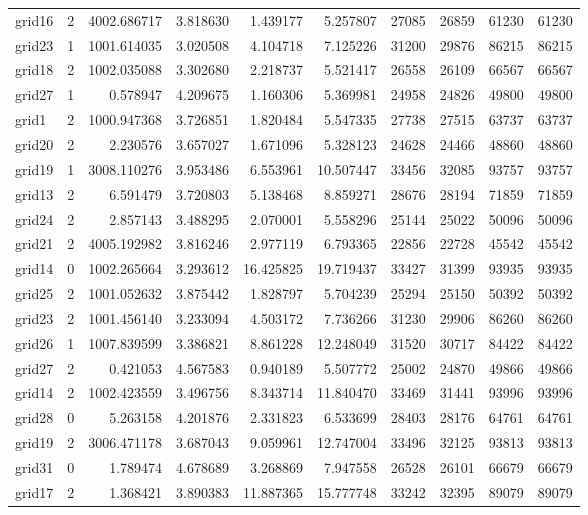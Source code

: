 \begin{longtable}{|l|r|r|r|r|r|r|r|r|r|}
grid16 & 2 & 4002.686717 & 3.818630 & 1.439177 & 5.257807 & 27085 & 26859 & 61230 & 61230 \\
grid23 & 1 & 1001.614035 & 3.020508 & 4.104718 & 7.125226 & 31200 & 29876 & 86215 & 86215 \\
grid18 & 2 & 1002.035088 & 3.302680 & 2.218737 & 5.521417 & 26558 & 26109 & 66567 & 66567 \\
grid27 & 1 & 0.578947 & 4.209675 & 1.160306 & 5.369981 & 24958 & 24826 & 49800 & 49800 \\
grid1 & 2 & 1000.947368 & 3.726851 & 1.820484 & 5.547335 & 27738 & 27515 & 63737 & 63737 \\
grid20 & 2 & 2.230576 & 3.657027 & 1.671096 & 5.328123 & 24628 & 24466 & 48860 & 48860 \\
grid19 & 1 & 3008.110276 & 3.953486 & 6.553961 & 10.507447 & 33456 & 32085 & 93757 & 93757 \\
grid13 & 2 & 6.591479 & 3.720803 & 5.138468 & 8.859271 & 28676 & 28194 & 71859 & 71859 \\
grid24 & 2 & 2.857143 & 3.488295 & 2.070001 & 5.558296 & 25144 & 25022 & 50096 & 50096 \\
grid21 & 2 & 4005.192982 & 3.816246 & 2.977119 & 6.793365 & 22856 & 22728 & 45542 & 45542 \\
grid14 & 0 & 1002.265664 & 3.293612 & 16.425825 & 19.719437 & 33427 & 31399 & 93935 & 93935 \\
grid25 & 2 & 1001.052632 & 3.875442 & 1.828797 & 5.704239 & 25294 & 25150 & 50392 & 50392 \\
grid23 & 2 & 1001.456140 & 3.233094 & 4.503172 & 7.736266 & 31230 & 29906 & 86260 & 86260 \\
grid26 & 1 & 1007.839599 & 3.386821 & 8.861228 & 12.248049 & 31520 & 30717 & 84422 & 84422 \\
grid27 & 2 & 0.421053 & 4.567583 & 0.940189 & 5.507772 & 25002 & 24870 & 49866 & 49866 \\
grid14 & 2 & 1002.423559 & 3.496756 & 8.343714 & 11.840470 & 33469 & 31441 & 93996 & 93996 \\
grid28 & 0 & 5.263158 & 4.201876 & 2.331823 & 6.533699 & 28403 & 28176 & 64761 & 64761 \\
grid19 & 2 & 3006.471178 & 3.687043 & 9.059961 & 12.747004 & 33496 & 32125 & 93813 & 93813 \\
grid31 & 0 & 1.789474 & 4.678689 & 3.268869 & 7.947558 & 26528 & 26101 & 66679 & 66679 \\
grid17 & 2 & 1.368421 & 3.890383 & 11.887365 & 15.777748 & 33242 & 32395 & 89079 & 89079 \\

\end{longtable}
